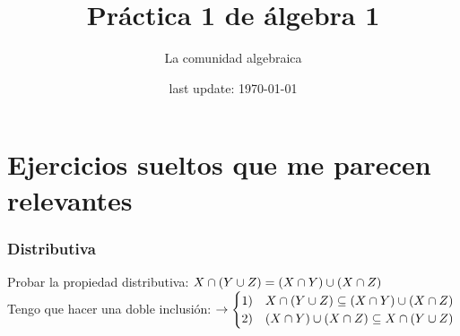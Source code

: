 

 



\title{Práctica 1 de álgebra 1} %
\author{La comunidad algebraica} %

\date{last update: \today} %
\maketitle  %



\section*{Ejercicios sueltos que me parecen relevantes}
\subsubsection*{Distributiva}
Probar la propiedad distributiva: $X \cap (Y \cup Z) = (X \cap Y) \cup (X \cap Z)$\\
Tengo que hacer una doble inclusión:
$\to \begin{cases}
		1) & X \cap (Y \cup Z) \subseteq (X \cap Y) \cup (X \cap Z) \\
		2) & (X \cap Y) \cup (X \cap Z) \subseteq X \cap (Y \cup Z)
	\end{cases}$

